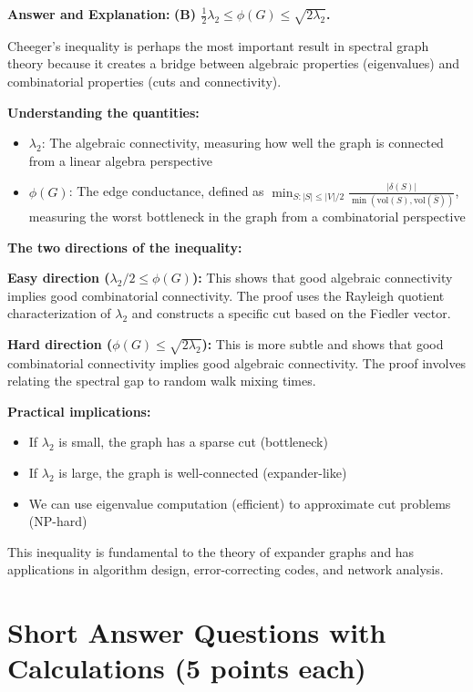 \documentclass[11pt]{article}
\newenvironment{answer}{\color{answercolor}\begin{framed}\textbf{Answer and Explanation:}}{\end{framed}}
\begin{document}
\begin{answer}
\textbf{(B) $\frac{1}{2}\lambda_2 \leq \phi(G) \leq \sqrt{2\lambda_2}$.}

Cheeger's inequality is perhaps the most important result in spectral graph theory because it creates a bridge between algebraic properties (eigenvalues) and combinatorial properties (cuts and connectivity).

\textbf{Understanding the quantities:}
\begin{itemize}
    \item $\lambda_2$: The algebraic connectivity, measuring how well the graph is connected from a linear algebra perspective
    \item $\phi(G)$: The edge conductance, defined as $\min_{S: |S| \leq |V|/2} \frac{|\delta(S)|}{\min(\text{vol}(S), \text{vol}(\bar{S}))}$, measuring the worst bottleneck in the graph from a combinatorial perspective
\end{itemize}

\textbf{The two directions of the inequality:}

\textbf{Easy direction ($\lambda_2/2 \leq \phi(G)$):} 
This shows that good algebraic connectivity implies good combinatorial connectivity. The proof uses the Rayleigh quotient characterization of $\lambda_2$ and constructs a specific cut based on the Fiedler vector.

\textbf{Hard direction ($\phi(G) \leq \sqrt{2\lambda_2}$):}
This is more subtle and shows that good combinatorial connectivity implies good algebraic connectivity. The proof involves relating the spectral gap to random walk mixing times.

\textbf{Practical implications:}
\begin{itemize}
    \item If $\lambda_2$ is small, the graph has a sparse cut (bottleneck)
    \item If $\lambda_2$ is large, the graph is well-connected (expander-like)
    \item We can use eigenvalue computation (efficient) to approximate cut problems (NP-hard)
\end{itemize}

This inequality is fundamental to the theory of expander graphs and has applications in algorithm design, error-correcting codes, and network analysis.
\end{answer}

\section{Short Answer Questions with Calculations (5 points each)}
\end{document}
